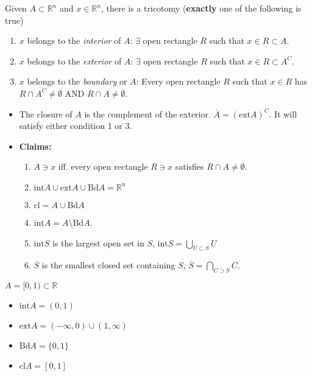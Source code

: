 \documentclass[a4paper]{article}
\numberwithin{equation}{section}
\newcommand{\R}{\mathbb{R}}
\begin{document}
\begin{definition}
    Given $A\subset\R^n$ and $x\in\R^n$, there is a tricotomy (\textbf{exactly} one of the following is true)
    \begin{enumerate}
        \item $x$ belongs to the \textit{interior} of $A$: $\exists$ open rectangle $R$ such that $x\in R\subset A$.
        \item $x$ belongs to the \textit{exterior} of $A$: $\exists$ open rectangle $R$ such that $x\in R\subset A^C$.
        \item $x$ belongs to the \textit{boundary} or $A$: Every open rectangle $R$ such that $x\in R$ has $R\cap A^C\neq\emptyset$ AND $R\cap A\neq\emptyset$.
    \end{enumerate}
    \begin{itemize}
        \item The closure of $A$ is the complement of the exterior. $\overline{A} = (\mathrm{ext} A)^C$. It will satisfy either condition 1 or 3.
        \item \textbf{Claims: } 
        \begin{enumerate}
            \item $\overline A\ni x$ iff. every open rectangle $R\ni x$ satisfies $R\cap A\neq\emptyset$.
            \item $\mathrm{int} A\cup\mathrm{ext} A\cup \mathrm{Bd} A=\R^n$
            \item $\mathrm{cl} = A\cup\mathrm{Bd} A$
            \item $\mathrm{int} A=A\setminus \mathrm{Bd}A$.
            \item $\mathrm{int} S$ is the largest open set in $S$, $\mathrm{int} S=\bigcup_{U\subset S}U$
            \item $\overline{S}$ is the smallest closed set containing $S$, $\overline{S}=\bigcap_{C\supset S}C$.
        \end{enumerate}
    \end{itemize}
\end{definition}
\begin{example}
    $A=[0,1)\subset \R$
    \begin{itemize}
        \item $\mathrm{int} A=(0,1)$
        \item $\mathrm{ext} A=(-\infty,0)\cup(1,\infty)$
        \item $\mathrm{Bd} A= \{0,1\}$
        \item $\mathrm{cl} A=[0,1]$
    \end{itemize}
\end{example}
\end{document}
